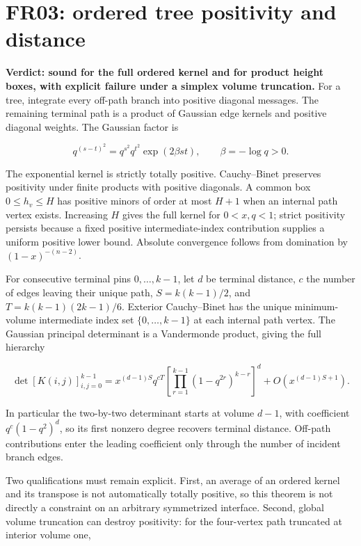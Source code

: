 \documentclass[
  11pt,
  a4paper,
]{report}
\begin{document}
\hypertarget{fr03-ordered-tree-positivity-and-distance}{%
\section{FR03: ordered tree positivity and
distance}\label{fr03-ordered-tree-positivity-and-distance}}

\textbf{Verdict: sound for the full ordered kernel and for product
height boxes, with explicit failure under a simplex volume truncation.}
For a tree, integrate every off-path branch into positive diagonal
messages. The remaining terminal path is a product of Gaussian edge
kernels and positive diagonal weights. The Gaussian factor is

\[
 q^{(s-t)^2}=q^{s^2}q^{t^2}\exp(2\beta st),\qquad \beta=-\log q>0.
\]

The exponential kernel is strictly totally positive. Cauchy--Binet
preserves positivity under finite products with positive diagonals. A
common box \(0\le h_v\le H\) has positive minors of order at most
\(H+1\) when an internal path vertex exists. Increasing \(H\) gives the
full kernel for \(0<x,q<1\); strict positivity persists because a fixed
positive intermediate-index contribution supplies a uniform positive
lower bound. Absolute convergence follows from domination by
\((1-x)^{-(n-2)}\).

For consecutive terminal pins \(0,\ldots,k-1\), let \(d\) be terminal
distance, \(c\) the number of edges leaving their unique path,
\(S=k(k-1)/2\), and \(T=k(k-1)(2k-1)/6\). Exterior Cauchy--Binet has the
unique minimum-volume intermediate index set \(\{0,\ldots,k-1\}\) at
each internal path vertex. The Gaussian principal determinant is a
Vandermonde product, giving the full hierarchy

\[
 \det[K(i,j)]_{i,j=0}^{k-1}
 =x^{(d-1)S}q^{cT}
 \left[\prod_{r=1}^{k-1}(1-q^{2r})^{k-r}\right]^d
 +O\!\left(x^{(d-1)S+1}\right).
\]

In particular the two-by-two determinant starts at volume \(d-1\), with
coefficient \(q^c(1-q^2)^d\), so its first nonzero degree recovers
terminal distance. Off-path contributions enter the leading coefficient
only through the number of incident branch edges.

Two qualifications must remain explicit. First, an average of an ordered
kernel and its transpose is not automatically totally positive, so this
theorem is not directly a constraint on an arbitrary symmetrized
interface. Second, global volume truncation can destroy positivity: for
the four-vertex path truncated at interior volume one,
\end{document}
